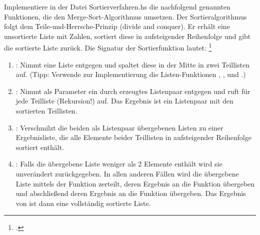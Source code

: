 \documentclass{bschlangaul-aufgabe}
\begin{document}

Implementiere in der Datei Sortierverfahren.hs die nachfolgend genannten
Funktionen, die den Merge-Sort-Algorithmus umsetzen. Der
Sortieralgorithmus folgt dem Teile-und-Herrsche-Prinzip (divide and
conquer). Er erhält eine unsortierte Liste mit Zahlen, sortiert diese in
aufsteigender Reihenfolge und gibt die sortierte Liste zurück. Die
Signatur der Sortierfunktion lautet: 
\footcite{fumup:ab:3}

\begin{enumerate}


\item {}: Nimmt eine
Liste entgegen und spaltet diese in der Mitte in zwei Teillisten auf.
(Tipp: Verwende zur Implementierung die Listen-Funktionen
, ,  und
.)


\item {}: Nimmt
als Parameter ein durch  erzeugtes Listenpaar
entgegen und ruft für jede Teilliste 
(Rekursion!) auf. Das Ergebnis ist ein Listenpaar mit den sortierten
Teillisten.


\item {}: Verschmilzt die
beiden als Listenpaar übergebenen Listen zu einer Ergebnisliste, die
alle Elemente beider Teillisten in aufsteigender Reihenfolge sortiert
enthält.


\item {}: Falls die übergebene
Liste weniger als 2 Elemente enthält wird sie unverändert zurückgegeben.
In allen anderen Fällen wird die übergebene Liste mittels der Funktion
 zerteilt, deren Ergebnis an die Funktion
 übergeben und abschließend deren Ergebnis an die
Funktion  übergeben. Das Ergebnis von
 ist dann eine vollständig sortierte Liste.

\end{enumerate}
\end{document}
